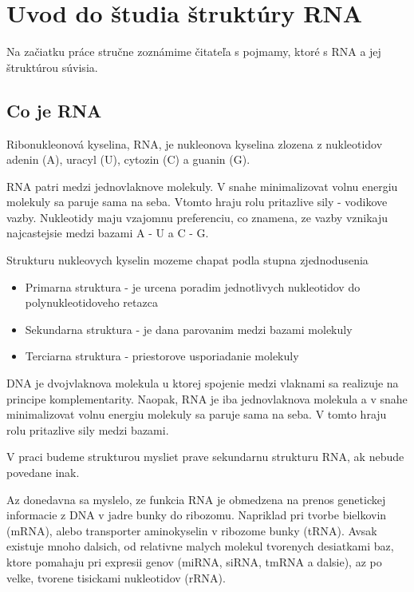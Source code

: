 
\renewcommand{\SS}{\mathbb{S}}
\newcommand{\Par}[2]{\mbox{$( #1, #2 )$}}
\usetikzlibrary{positioning, shapes, trees, graphs} %
\newcommand{\scale}{0.6}

\chapter{Uvod do študia štruktúry RNA}

Na začiatku práce stručne zoznámime čitateľa s pojmamy, ktoré s RNA a jej štruktúrou súvisia.

\section{Co je RNA}

Ribonukleonová kyselina, RNA, je nukleonova kyselina zlozena z nukleotidov adenin (A), uracyl (U),
cytozin (C) a guanin (G).

RNA patri medzi jednovlaknove molekuly. V snahe minimalizovat volnu energiu molekuly sa paruje sama na seba.
Vtomto hraju rolu pritazlive sily - vodikove vazby. Nukleotidy maju vzajomnu preferenciu, co znamena,
ze vazby vznikaju najcastejsie medzi bazami A - U a C - G.

Strukturu nukleovych kyselin mozeme chapat podla stupna zjednodusenia
\begin{itemize}
  \item Primarna struktura - je urcena poradim jednotlivych nukleotidov
    do polynukleotidoveho retazca
  \item Sekundarna struktura - je dana parovanim medzi bazami molekuly
  \item Terciarna struktura - priestorove usporiadanie molekuly
\end{itemize}
DNA je dvojvlaknova molekula u ktorej spojenie medzi vlaknami sa realizuje na principe
komplementarity.
Naopak, RNA je iba jednovlaknova molekula a v snahe minimalizovat volnu energiu molekuly
sa paruje sama na seba. V tomto hraju rolu pritazlive sily medzi bazami.

V praci budeme strukturou mysliet prave sekundarnu strukturu RNA, ak nebude povedane inak.

Az donedavna sa myslelo, ze funkcia RNA je obmedzena na prenos genetickej informacie z DNA
v jadre bunky do ribozomu. Napriklad pri tvorbe bielkovin (mRNA), alebo transporter aminokyselin
v ribozome bunky (tRNA).
Avsak existuje mnoho dalsich, od relativne
malych molekul tvorenych desiatkami baz, ktore pomahaju pri expresii genov
(miRNA, siRNA, tmRNA a dalsie), az po velke, tvorene tisickami nukleotidov (rRNA).

